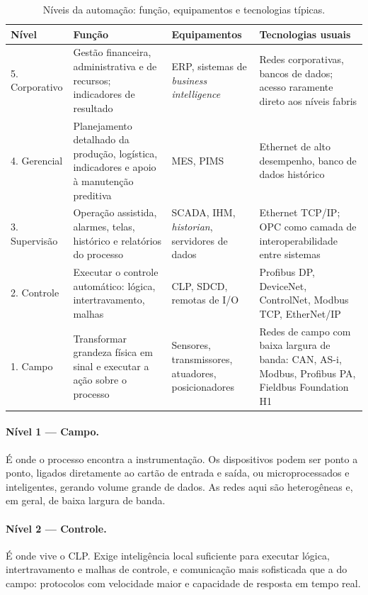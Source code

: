 \begin{table}[H]
  \centering
  \caption{Níveis da automação: função, equipamentos e tecnologias típicas.}
  \label{tab:niveis}
  \begin{tabular}{p{2.6cm} p{4.3cm} p{3.4cm} p{4.3cm}}
    \toprule
    Nível & Função & Equipamentos & Tecnologias usuais \\
    \midrule
    5. Corporativo
      & Gestão financeira, administrativa e de recursos; indicadores de resultado
      & ERP, sistemas de \emph{business intelligence}
      & Redes corporativas, bancos de dados; acesso raramente direto aos níveis fabris \\
    4. Gerencial
      & Planejamento detalhado da produção, logística, indicadores e apoio à manutenção preditiva
      & MES, PIMS
      & Ethernet de alto desempenho, banco de dados histórico \\
    3. Supervisão
      & Operação assistida, alarmes, telas, histórico e relatórios do processo
      & SCADA, IHM, \emph{historian}, servidores de dados
      & Ethernet TCP/IP; OPC como camada de interoperabilidade entre sistemas \\
    2. Controle
      & Executar o controle automático: lógica, intertravamento, malhas
      & CLP, SDCD, remotas de I/O
      & Profibus DP, DeviceNet, ControlNet, Modbus TCP, EtherNet/IP \\
    1. Campo
      & Transformar grandeza física em sinal e executar a ação sobre o processo
      & Sensores, transmissores, atuadores, posicionadores
      & Redes de campo com baixa largura de banda: CAN, AS-i, Modbus, Profibus PA, Fieldbus Foundation H1 \\
    \bottomrule
  \end{tabular}
\end{table}

\paragraph{Nível 1 --- Campo.} É onde o processo encontra a instrumentação. Os dispositivos podem ser
ponto a ponto, ligados diretamente ao cartão de entrada e saída, ou microprocessados e inteligentes,
gerando volume grande de dados. As redes aqui são heterogêneas e, em geral, de baixa largura de
banda.

\paragraph{Nível 2 --- Controle.} É onde vive o CLP. Exige inteligência local suficiente para
executar lógica, intertravamento e malhas de controle, e comunicação mais sofisticada que a do
campo: protocolos com velocidade maior e capacidade de resposta em tempo real.

